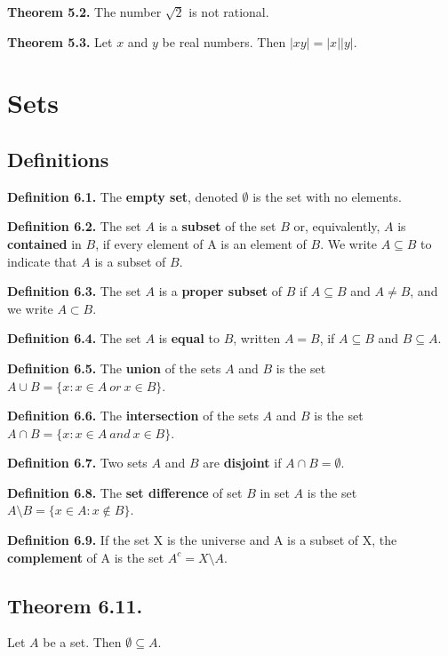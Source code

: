 \documentclass{article}
\begin{document}
\textbf{Theorem 5.2.} The number $\sqrt{2}$ is not rational.

\textbf{Theorem 5.3.} Let $x$ and $y$ be real numbers. Then $|xy| = |x||y|$.


\section{Sets}
\subsection{Definitions}
\textbf{Definition 6.1.} The \textbf{empty set}, denoted $\emptyset$ is the set with no elements.

\textbf{Definition 6.2.} The set $A$ is a \textbf{subset} of the set $B$ or, equivalently, $A$ is \textbf{contained} in $B$, if every element of A is an element of $B$. We write $A \subseteq B$ to indicate that $A$ is a subset of $B$. 

\textbf{Definition 6.3.} The set $A$ is a \textbf{proper subset} of $B$ if $A \subseteq B$ and $A \neq B$, and we write $A \subset B$.

\textbf{Definition 6.4.} The set $A$ is \textbf{equal} to $B$, written $A = B$, if $A \subseteq B$ and $B \subseteq A$.

\textbf{Definition 6.5.} The \textbf{union} of the sets $A$ and $B$ is the set 
	$A \cup B = \{x : x \in A\ or\ x \in B \}$.
	
\textbf{Definition 6.6.} The \textbf{intersection} of the sets $A$ and $B$ is the set 
	$A \cap B = \{x : x \in A\ and\ x \in B \}$.
	
\textbf{Definition 6.7.} Two sets $A$ and $B$ are \textbf{disjoint} if $A \cap B = \emptyset$.

\textbf{Definition 6.8.} The \textbf{set difference} of set $B$ in set $A$ is the set 
	$A \setminus B = \{x \in A : x \notin B \}$.
	
\textbf{Definition 6.9.} If the set X is the universe and A is a subset of X, the  \textbf{complement} of A is the set $A^c = X \setminus A$.

\subsection{Theorem 6.11.} Let $A$ be a set. Then $\emptyset \subseteq A$. 
\end{document}
